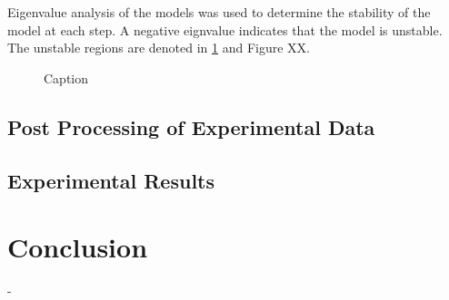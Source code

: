 \documentclass{IEEEtran}
\begin{document}
        Eigenvalue analysis of the models was used to determine the stability of the model at each step. A negative eignvalue indicates that the model is unstable. The unstable regions are denoted in \cref{fig:TPUinUout} and Figure XX. 
    	\begin{figure}[!h]
        	\centering
        	
        	\caption{Caption}
        	\label{fig:TPUinUout}
        \end{figure}

        \subsection{Post Processing of Experimental Data}
    
        
        \subsection{Experimental Results}
        
    

    \section{Conclusion}

 -
	
	\newpage
    \printbibliography
	
\end{document}

